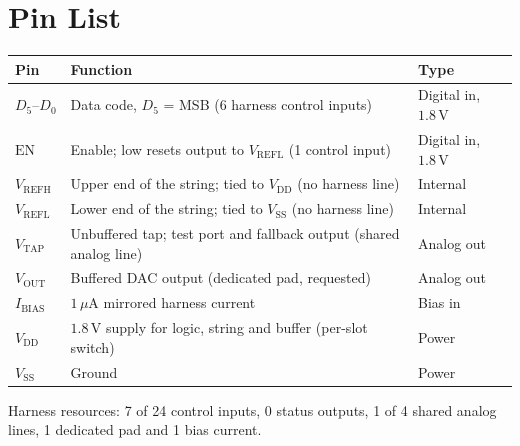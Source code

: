 \documentclass[10pt,a4paper]{article}
\newcommand{\vrefh}{\ensuremath{V_{\mathrm{REFH}}}}
\newcommand{\vrefl}{\ensuremath{V_{\mathrm{REFL}}}}
\newcommand{\vtap}{\ensuremath{V_{\mathrm{TAP}}}}
\newcommand{\vout}{\ensuremath{V_{\mathrm{OUT}}}}
\newcommand{\vdd}{\ensuremath{V_{\mathrm{DD}}}}
\newcommand{\vssa}{\ensuremath{V_{\mathrm{SS}}}}
\newcommand{\ibias}{\ensuremath{I_{\mathrm{BIAS}}}}
\newcommand{\en}{\ensuremath{\mathrm{EN}}}
\newcommand{\dbus}{\ensuremath{D_5\text{--}D_0}}
\begin{document}
\section{Pin List}
\begin{table}[H]
  \centering
  \begin{tabular}{@{}l l l@{}}
    \toprule
    \textbf{Pin} & \textbf{Function} & \textbf{Type} \\
    \midrule
    \dbus       & Data code, $D_5$ = MSB (6 harness control inputs)              & Digital in, $1.8\,\mathrm{V}$ \\
    \en         & Enable; low resets output to \vrefl{} (1 control input)        & Digital in, $1.8\,\mathrm{V}$ \\
    \vrefh      & Upper end of the string; tied to \vdd{} (no harness line)       & Internal \\
    \vrefl      & Lower end of the string; tied to \vssa{} (no harness line)       & Internal \\
    \vtap       & Unbuffered tap; test port and fallback output (shared analog line) & Analog out \\
    \vout       & Buffered DAC output (dedicated pad, requested)                 & Analog out \\
    \ibias      & $1\,\mu\mathrm{A}$ mirrored harness current                     & Bias in \\
    \vdd        & $1.8\,\mathrm{V}$ supply for logic, string and buffer (per-slot switch) & Power \\
    \vssa        & Ground                                                         & Power \\
    \bottomrule
  \end{tabular}
\end{table}

Harness resources: 7 of 24 control inputs, 0 status outputs, 1 of 4 shared analog lines, 1 dedicated pad and 1 bias current.

\end{document}
